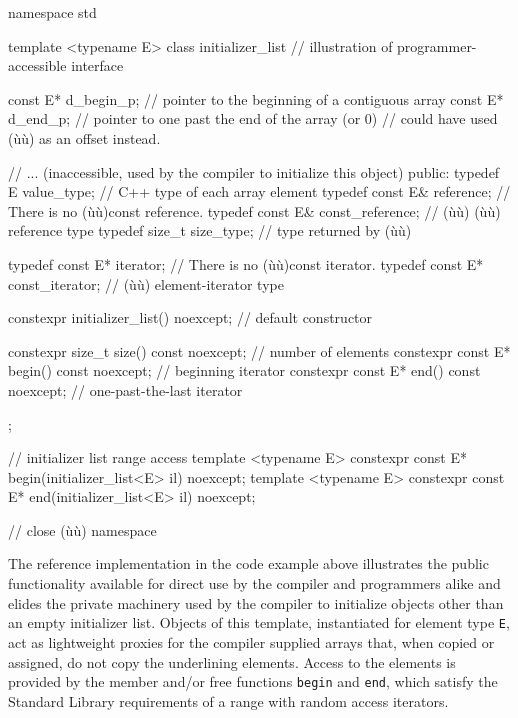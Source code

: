 \begin{emcppslisting}
namespace std
{

template <typename E>
class initializer_list  // illustration of programmer-accessible interface
{
    const E* d_begin_p;  // pointer to the beginning of a contiguous array
    const E* d_end_p;    // pointer to one past the end of the array (or 0)
                         // could have used (ù{}ù) as an offset instead.

    // ... (inaccessible, used by the compiler to initialize this object)
public:
    typedef E value_type;               // C++ type of each array element
    typedef const E& reference;         // There is no (ù{}ù)const reference.
    typedef const E& const_reference;   // (ù{}ù) (ù{}ù) reference type
    typedef size_t size_type;           // type returned by (ù{}ù)

    typedef const E* iterator;          // There is no (ù{}ù)const iterator.
    typedef const E* const_iterator;    // (ù{}ù) element-iterator type

    constexpr initializer_list() noexcept;  // default constructor

    constexpr size_t size() const noexcept;     // number of elements
    constexpr const E* begin() const noexcept;  // beginning iterator
    constexpr const E* end() const noexcept;    // one-past-the-last iterator
};

// initializer list range access
template <typename E> constexpr const E* begin(initializer_list<E> il) noexcept;
template <typename E> constexpr const E* end(initializer_list<E> il) noexcept;

}  // close (ù{}ù) namespace
\end{emcppslisting}
    

\noindent The reference implementation in the code example above illustrates the
public functionality available for direct use by the compiler and
programmers alike and elides the private machinery used by the compiler
to initialize objects other than an empty initializer list. Objects of
this template, instantiated for element type \lstinline!E!, act as
lightweight proxies for the compiler supplied arrays that, when copied
or assigned, do not copy the underlining elements. Access to the
elements is provided by the member and/or free functions \lstinline!begin!
and \lstinline!end!, which satisfy the Standard Library requirements of a
range with random access iterators.

